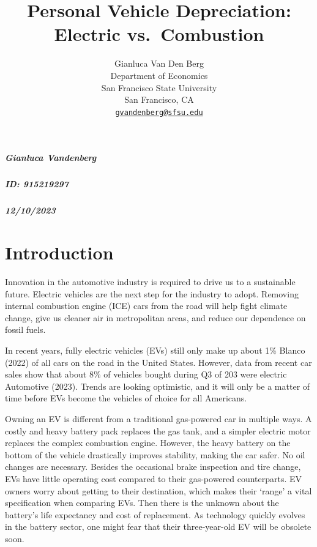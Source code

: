 \documentclass{article}
\title{Personal Vehicle Depreciation: Electric vs.~Combustion}
\author{
    Gianluca Van Den Berg
   \\
    Department of Economics \\
    San Francisco State University \\
  San Francisco, CA \\
  \texttt{\href{mailto:gvandenberg@sfsu.edu}{\nolinkurl{gvandenberg@sfsu.edu}}} \\
  }
\begin{document}
\maketitle


\begin{abstract}

\end{abstract}


\hypertarget{gianluca-vandenberg}{%
\subparagraph{Gianluca Vandenberg}\label{gianluca-vandenberg}}

\hypertarget{id-915219297}{%
\subparagraph{ID: 915219297}\label{id-915219297}}

\hypertarget{section}{%
\subparagraph{12/10/2023}\label{section}}

\hypertarget{introduction}{%
\section{Introduction}\label{introduction}}

Innovation in the automotive industry is required to drive us to a
sustainable future. Electric vehicles are the next step for the industry
to adopt. Removing internal combustion engine (ICE) cars from the road
will help fight climate change, give us cleaner air in metropolitan
areas, and reduce our dependence on fossil fuels.

In recent years, fully electric vehicles (EVs) still only make up about
1\% Blanco (2022) of all cars on the road in the United States. However,
data from recent car sales show that about 8\% of vehicles bought during
Q3 of 203 were electric Automotive (2023). Trends are looking
optimistic, and it will only be a matter of time before EVs become the
vehicles of choice for all Americans.

Owning an EV is different from a traditional gas-powered car in multiple
ways. A costly and heavy battery pack replaces the gas tank, and a
simpler electric motor replaces the complex combustion engine. However,
the heavy battery on the bottom of the vehicle drastically improves
stability, making the car safer. No oil changes are necessary. Besides
the occasional brake inspection and tire change, EVs have little
operating cost compared to their gas-powered counterparts. EV owners
worry about getting to their destination, which makes their `range' a
vital specification when comparing EVs. Then there is the unknown about
the battery's life expectancy and cost of replacement. As technology
quickly evolves in the battery sector, one might fear that their
three-year-old EV will be obsolete soon.
\end{document}
